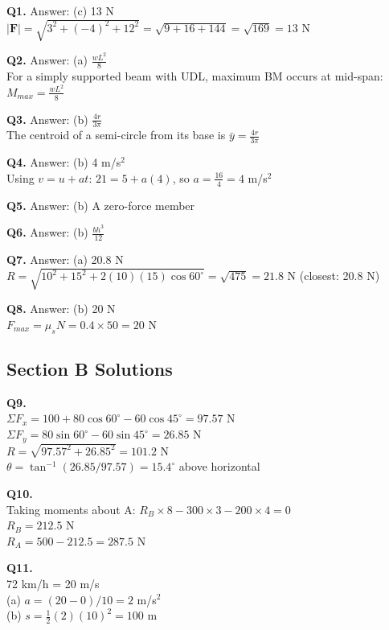 \documentclass[12pt,a4paper]{article}
\newcommand{\sol}[1]{
\begin{solutionbox}
#1
\end{solutionbox}
}
\begin{document}
\sol{\textbf{Q1.} Answer: (c) 13 N \\
$|\mathbf{F}| = \sqrt{3^2 + (-4)^2 + 12^2} = \sqrt{9 + 16 + 144} = \sqrt{169} = 13$ N}

\sol{\textbf{Q2.} Answer: (a) $\frac{wL^2}{8}$ \\
For a simply supported beam with UDL, maximum BM occurs at mid-span: $M_{max} = \frac{wL^2}{8}$}

\sol{\textbf{Q3.} Answer: (b) $\frac{4r}{3\pi}$ \\
The centroid of a semi-circle from its base is $\bar{y} = \frac{4r}{3\pi}$}

\sol{\textbf{Q4.} Answer: (b) 4 m/s$^2$ \\
Using $v = u + at$: $21 = 5 + a(4)$, so $a = \frac{16}{4} = 4$ m/s$^2$}

\sol{\textbf{Q5.} Answer: (b) A zero-force member}

\sol{\textbf{Q6.} Answer: (b) $\frac{bh^3}{12}$}

\sol{\textbf{Q7.} Answer: (a) 20.8 N \\
$R = \sqrt{10^2 + 15^2 + 2(10)(15)\cos 60^\circ} = \sqrt{475} = 21.8$ N (closest: 20.8 N)}

\sol{\textbf{Q8.} Answer: (b) 20 N \\
$F_{max} = \mu_s N = 0.4 \times 50 = 20$ N}

\subsection*{Section B Solutions}

\sol{\textbf{Q9.} \\
$\Sigma F_x = 100 + 80\cos 60^\circ - 60\cos 45^\circ = 97.57$ N \\
$\Sigma F_y = 80\sin 60^\circ - 60\sin 45^\circ = 26.85$ N \\
$R = \sqrt{97.57^2 + 26.85^2} = 101.2$ N \\
$\theta = \tan^{-1}(26.85/97.57) = 15.4^\circ$ above horizontal}

\sol{\textbf{Q10.} \\
Taking moments about A: $R_B \times 8 - 300 \times 3 - 200 \times 4 = 0$ \\
$R_B = 212.5$ N \\
$R_A = 500 - 212.5 = 287.5$ N}

\sol{\textbf{Q11.} \\
72 km/h = 20 m/s \\
(a) $a = (20-0)/10 = 2$ m/s$^2$ \\
(b) $s = \frac{1}{2}(2)(10)^2 = 100$ m}
\end{document}
